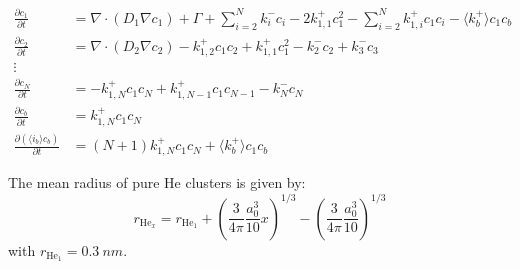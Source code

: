 \begin{subequations}
    \begin{align}
        \frac{\partial c_1}{\partial t} &= \nabla \cdot (D_1 \nabla c_1) + \Gamma + \sum\limits_{i=2}^N k_{i}^- c_i- 2k_{1, 1}^+ c_1^2 - \sum\limits_{i=2}^N k_{1,i}^+ c_1 c_i - \langle k_b^+ \rangle c_1 c_b \\
        \frac{\partial c_2}{\partial t} &= \nabla \cdot (D_2 \nabla c_2) - k_{1, 2}^+ c_1 c_2 + k_{1, 1}^+ c_1^2 - k_{2}^- c_2 + k_{3}^- c_3\\
        \vdots \nonumber\\
        \frac{\partial c_N}{\partial t} &= - k_{1, N}^+ c_1 c_N + k_{1, N-1}^+ c_1 c_{N-1} - k_{N}^- c_N\\
        \frac{\partial c_b}{\partial t} &= k_ {1,N}^+ c_1 c_N \\
        \frac{\partial (\langle i_b \rangle c_b)}{\partial t} &= (N+1)k_ {1,N}^+ c_1 c_N  + \langle k_b^+ \rangle c_1 c_b
    \end{align}
    \label{eq: temporal evolution grouping}
\end{subequations}

The mean radius of pure He clusters  is given by:
\begin{equation}
    r_{\mathrm{He}_x} = r_{\mathrm{He}_1} + \left(\frac{3}{4\pi} \frac{a_0^3}{10} x \right)^{1/3} - \left( \frac{3}{4\pi} \frac{a_0^3}{10} \right)^{1/3}
    \label{eq: radius pure He}
\end{equation}
with $r_{\mathrm{He}_1} = \SI{0.3}{nm}$.

